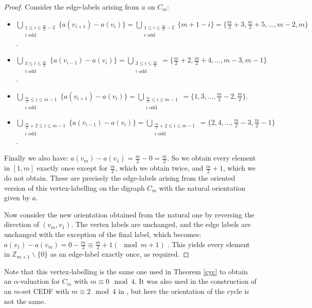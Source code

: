 \documentclass[12pt, a4paper]{article}
\theoremstyle{definition}
\begin{document}
\begin{proof}
Consider the edge-labels arising from $a$ on $C_m$:
\begin{itemize}
\item[(1)] $\bigcup_{\substack{1 \leq i \leq \frac{m}{2}-2 \\i \text{ odd }}}\{a(v_{i+1})-a(v_{i}) \} = \bigcup_{\substack{1 \leq i \leq \frac{m}{2}-2 \\i \text{ odd }}}\{m+1-i\}=\{\frac{m}{2}+3, \frac{m}{2}+5, \ldots, m-2,m\}$.
\item[(2)] $\bigcup_{\substack{3 \leq i \leq \frac{m}{2} \\i \text{ odd }}}\{a(v_{i-1})-a(v_i) \} = \bigcup_{\substack{3 \leq i \leq \frac{m}{2} \\i \text{ odd }}}=\{\frac{m}{2}+2,\frac{m}{2}+4,\ldots, m-3,m-1\}$.
\item[(3)] $\bigcup_{\substack{\frac{m}{2} \leq i \leq m-1 \\i \text{ odd }}}\{a(v_{i+1})-a(v_i)\} = \bigcup_{\substack{\frac{m}{2} \leq i \leq m-1 \\i \text{ odd }}}=\{1,3, \ldots, \frac{m}{2}-2, \frac{m}{2}\}$.
\item[(4)] $\bigcup_{\substack{\frac{m}{2}+2 \leq i \leq m-1 \\i \text{ odd }}}\{a(v_{i-1})-a(v_i) \} = \bigcup_{\substack{\frac{m}{2}+2 \leq i \leq m-1 \\i \text{ odd }}}=\{2,4, \ldots, \frac{m}{2}-3,\frac{m}{2}-1\}$.
\end{itemize}  
Finally we also have: $a(v_m)-a(v_1) = \frac{m}{2}-0 = \frac{m}{2}$.
So we obtain every element in $[1,m]$ exactly once except for $\frac{m}{2}$, which we obtain twice, and $\frac{m}{2}+1$, which we do not obtain. These are precisely the edge-labels arising from the oriented version of this vertex-labelling on the digraph $C_m$ with the natural orientation given by $a$.

Now consider the new orientation obtained from the natural one by reversing the direction of $(v_m,v_1)$.  The vertex labels are unchanged, and the edge labels are unchanged with the exception of the final label, which becomes:
$a(v_1)-a(v_m) = 0-\frac{m}{2} \equiv \frac{m}{2}+1 (\mod m+1)$ . This yields every element in $\mathbb{Z}_{m+1}\backslash\{0\}$ as an edge-label exactly once, as required.
\end{proof}
Note that this vertex-labelling is the same one used in Theorem \ref{cyc} to obtain an $\alpha$-valuation for $C_m$ with $m \equiv 0 \mod 4$.  It was also used in the construction of an $m$-set CEDF with $m \equiv 2 \mod 4$ in \cite{PatStiCEDF}, but here the orientation of the cycle is not the same.
\end{document}

